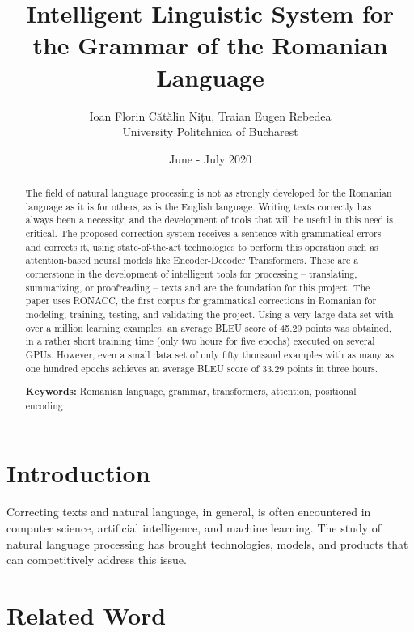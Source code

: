 \documentclass{article}
\title{Intelligent Linguistic System for the Grammar of the Romanian Language}
\author{Ioan Florin Cătălin Nițu, Traian Eugen Rebedea\\
University Politehnica of Bucharest}
\date{June - July 2020}
\providecommand{\keywords}[1]{
    \small
    \textbf{Keywords: } #1
}
\begin{document}
    
    \maketitle
    
    \begin{abstract}
        
        The field of natural language processing is not as strongly developed for the Romanian language as it is for others, as is the English language. Writing texts correctly has always been a necessity, and the development of tools that will be useful in this need is critical. The proposed correction system receives a sentence with grammatical errors and corrects it, using state-of-the-art technologies to perform this operation such as attention-based neural models like Encoder-Decoder Transformers. These are a cornerstone in the development of intelligent tools for processing – translating, summarizing, or proofreading – texts and are the foundation for this project. The paper uses RONACC, the first corpus for grammatical corrections in Romanian for modeling, training, testing, and validating the project. Using a very large data set with over a million learning examples, an average BLEU score of 45.29 points was obtained, in a rather short training time (only two hours for five epochs) executed on several GPUs. However, even a small data set of only fifty thousand examples with as many as one hundred epochs achieves an average BLEU score of 33.29 points in three hours.  \cite{nitu2020intelligent}
        
        \keywords{Romanian language, grammar, transformers, attention, positional encoding}
        
    \end{abstract}
    
    \section{Introduction}
        
        Correcting texts and natural language, in general, is often encountered in computer science, artificial intelligence, and machine learning. The study of natural language processing has brought technologies, models, and products that can competitively address this issue.
        
    \section{Related Word}
        
\end{document}
